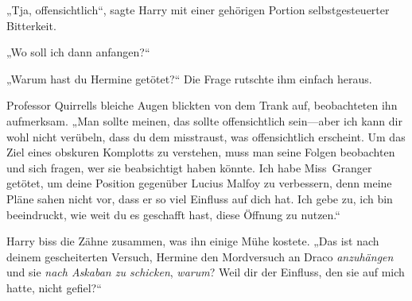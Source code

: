 „Tja, offensichtlich“, sagte Harry mit einer gehörigen Portion selbstgesteuerter Bitterkeit.

„Wo soll ich dann anfangen?“

„Warum hast du Hermine getötet?“
Die Frage rutschte ihm einfach heraus.

Professor Quirrells bleiche Augen blickten von dem Trank auf, beobachteten ihn aufmerksam.
„Man sollte meinen, das sollte offensichtlich sein—aber ich kann dir wohl nicht verübeln, dass du dem misstraust, was offensichtlich erscheint. Um das Ziel eines obskuren Komplotts zu verstehen, muss man seine Folgen beobachten und sich fragen, wer sie beabsichtigt haben könnte. Ich habe Miss~Granger getötet, um deine Position gegenüber Lucius Malfoy zu verbessern, denn meine Pläne sahen nicht vor, dass er so viel Einfluss auf dich hat. Ich gebe zu, ich bin beeindruckt, wie weit du es geschafft hast, diese Öffnung zu nutzen.“

Harry biss die Zähne zusammen, was ihn einige Mühe kostete.
„Das ist nach deinem gescheiterten Versuch, Hermine den Mordversuch an Draco \emph{anzuhängen} und sie \emph{nach Askaban zu schicken}, \emph{warum}? Weil dir der Einfluss, den sie auf mich hatte, nicht gefiel?“

